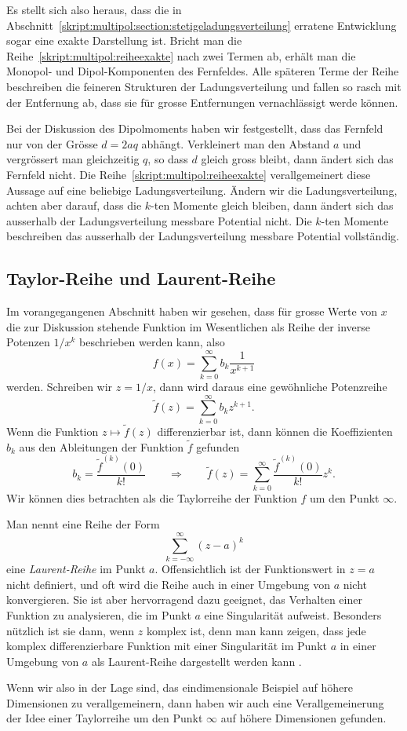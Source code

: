 Es stellt sich also heraus, dass die in
Abschnitt~\ref{skript:multipol:section:stetigeladungsverteilung}
erratene Entwicklung sogar eine exakte Darstellung ist.
Bricht man die Reihe~\eqref{skript:multipol:reiheexakte} nach zwei
Termen ab, erhält man die Monopol- und Dipol-Komponenten des
Fernfeldes.
Alle späteren Terme der Reihe beschreiben die feineren Strukturen
der Ladungsverteilung und fallen so rasch mit der Entfernung ab,
dass sie für grosse Entfernungen vernachlässigt werde können.

Bei der Diskussion des Dipolmoments haben wir festgestellt, dass das
Fernfeld nur von der Grösse $d=2aq$ abhängt.
Verkleinert man den Abstand $a$ und vergrössert man gleichzeitig $q$,
so dass $d$ gleich gross bleibt, dann ändert sich das Fernfeld nicht.
Die Reihe~\eqref{skript:multipol:reiheexakte} verallgemeinert diese
Aussage auf eine beliebige Ladungsverteilung.
Ändern wir die Ladungsverteilung, achten aber darauf, dass die
$k$-ten Momente gleich bleiben, dann ändert sich das ausserhalb der
Ladungsverteilung messbare Potential nicht.
Die $k$-ten Momente beschreiben das ausserhalb der Ladungsverteilung
messbare Potential vollständig.

\subsection{Taylor-Reihe und Laurent-Reihe}
Im vorangegangenen Abschnitt haben wir gesehen, dass für grosse Werte von
$x$ die zur Diskussion stehende Funktion im Wesentlichen als Reihe
der inverse Potenzen $1/x^k$ beschrieben werden kann, also
\[
f(x)=\sum_{k=0}^\infty b_k\frac1{x^{k+1}}
\]
werden.
Schreiben wir $z=1/x$, dann wird daraus eine gewöhnliche Potenzreihe
\[
\tilde f(z)=\sum_{k=0}^\infty b_k z^{k+1}.
\]
Wenn die Funktion $z\mapsto \tilde f(z)$ differenzierbar ist, dann
können die Koeffizienten $b_k$ aus den Ableitungen der Funktion
$\tilde f$ gefunden
\begin{equation}
b_k=\frac{\tilde f^{(k)}(0)}{k!}
\qquad\Rightarrow\qquad
\tilde f(z)
=
\sum_{k=0}^\infty \frac{\tilde f^{(k)}(0)}{k!}z^k.
\end{equation}
Wir können dies betrachten als die Taylorreihe der Funktion $f$ um
den Punkt $\infty$.

Man nennt eine Reihe der Form
\[
\sum_{k=-\infty}^{\infty} (z-a)^k
\]
eine {\em Laurent-Reihe} im Punkt $a$.
Offensichtlich ist der Funktionswert in $z=a$ nicht definiert, und
oft wird die Reihe auch in einer Umgebung von $a$ nicht konvergieren.
Sie ist aber hervorragend dazu geeignet, das Verhalten einer Funktion
zu analysieren, die im Punkt $a$ eine Singularität aufweist.
Besonders nützlich ist sie dann, wenn $z$ komplex ist, denn man
kann zeigen, dass jede komplex differenzierbare Funktion mit einer
Singularität im Punkt $a$ in einer Umgebung von $a$ als Laurent-Reihe
dargestellt werden kann \cite{skript:mathsemdgl}.

Wenn wir also in der Lage sind, das eindimensionale Beispiel auf höhere
Dimensionen zu verallgemeinern, dann haben wir auch eine Verallgemeinerung
der Idee einer Taylorreihe um den Punkt $\infty$ auf höhere Dimensionen
gefunden.








